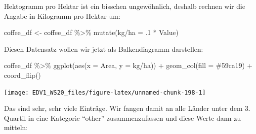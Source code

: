 \documentclass[
]{book}
\newenvironment{Shaded}{\begin{snugshade}}{\end{snugshade}}
\newcommand{\AttributeTok}[1]{\textcolor[rgb]{0.77,0.63,0.00}{#1}}
\newcommand{\DecValTok}[1]{\textcolor[rgb]{0.00,0.00,0.81}{#1}}
\newcommand{\FunctionTok}[1]{\textcolor[rgb]{0.00,0.00,0.00}{#1}}
\newcommand{\NormalTok}[1]{#1}
\newcommand{\OtherTok}[1]{\textcolor[rgb]{0.56,0.35,0.01}{#1}}
\newcommand{\SpecialCharTok}[1]{\textcolor[rgb]{0.00,0.00,0.00}{#1}}
\newcommand{\StringTok}[1]{\textcolor[rgb]{0.31,0.60,0.02}{#1}}
\begin{document}
Hektogramm pro Hektar ist ein bisschen ungewöhnlich, deshalb rechnen wir die Angabe in Kilogramm pro Hektar um:

\begin{Shaded}
\begin{Highlighting}[]
\NormalTok{coffee\_df }\OtherTok{\textless{}{-}}\NormalTok{ coffee\_df }\SpecialCharTok{\%\textgreater{}\%} 
  \FunctionTok{mutate}\NormalTok{(}\StringTok{\textquotesingle{}kg/ha\textquotesingle{}} \OtherTok{=}\NormalTok{ .}\DecValTok{1} \SpecialCharTok{*}\NormalTok{ Value)}
\end{Highlighting}
\end{Shaded}

Diesen Datensatz wollen wir jetzt als Balkendiagramm darstellen:

\begin{Shaded}
\begin{Highlighting}[]
\NormalTok{coffee\_df }\SpecialCharTok{\%\textgreater{}\%} 
  \FunctionTok{ggplot}\NormalTok{(}\FunctionTok{aes}\NormalTok{(}\AttributeTok{x =}\NormalTok{ Area,}
             \AttributeTok{y =} \StringTok{\textasciigrave{}}\AttributeTok{kg/ha}\StringTok{\textasciigrave{}}\NormalTok{)) }\SpecialCharTok{+}
  \FunctionTok{geom\_col}\NormalTok{(}\AttributeTok{fill =} \StringTok{\textquotesingle{}\#59ca19\textquotesingle{}}\NormalTok{) }\SpecialCharTok{+}
  \FunctionTok{coord\_flip}\NormalTok{()}
\end{Highlighting}
\end{Shaded}

\begin{center}\texttt{[image: EDV1\_WS20\_files/figure-latex/unnamed-chunk-198-1]} \end{center}

Das sind sehr, sehr viele Einträge. Wir fangen damit an alle Länder unter dem 3. Quartil in eine Kategorie ``other'' zusammenzufassen und diese Werte dann zu mitteln:
\end{document}
